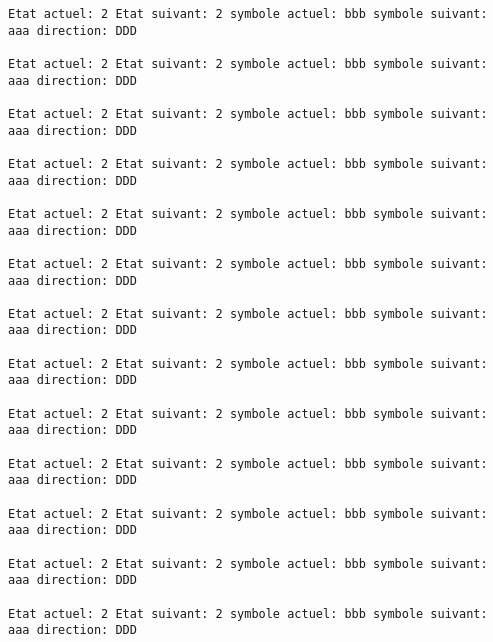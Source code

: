 \documentclass{article}
\begin{document}
\begin{verbatim}
Etat actuel: 2 Etat suivant: 2 symbole actuel: bbb symbole suivant: aaa direction: DDD

Etat actuel: 2 Etat suivant: 2 symbole actuel: bbb symbole suivant: aaa direction: DDD

Etat actuel: 2 Etat suivant: 2 symbole actuel: bbb symbole suivant: aaa direction: DDD

Etat actuel: 2 Etat suivant: 2 symbole actuel: bbb symbole suivant: aaa direction: DDD

Etat actuel: 2 Etat suivant: 2 symbole actuel: bbb symbole suivant: aaa direction: DDD

Etat actuel: 2 Etat suivant: 2 symbole actuel: bbb symbole suivant: aaa direction: DDD

Etat actuel: 2 Etat suivant: 2 symbole actuel: bbb symbole suivant: aaa direction: DDD

Etat actuel: 2 Etat suivant: 2 symbole actuel: bbb symbole suivant: aaa direction: DDD

Etat actuel: 2 Etat suivant: 2 symbole actuel: bbb symbole suivant: aaa direction: DDD

Etat actuel: 2 Etat suivant: 2 symbole actuel: bbb symbole suivant: aaa direction: DDD

Etat actuel: 2 Etat suivant: 2 symbole actuel: bbb symbole suivant: aaa direction: DDD

Etat actuel: 2 Etat suivant: 2 symbole actuel: bbb symbole suivant: aaa direction: DDD

Etat actuel: 2 Etat suivant: 2 symbole actuel: bbb symbole suivant: aaa direction: DDD
\end{verbatim}
\end{document}
